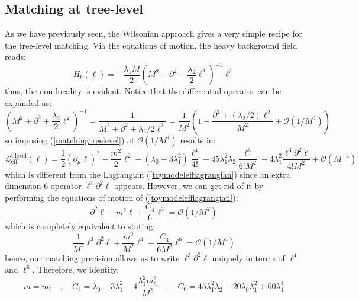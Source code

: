 \documentclass[11pt]{article}
\begin{document}
\subsection{Matching at tree-level}
As we have previously seen, the Wilsonian approach gives a very simple recipe for the tree-level matching. Via the equations of motion, the heavy background field reads:
\begin{equation}
    H_b(\ell)=-\dfrac{\lambda_1M}{2}\left(M^2+\partial^2+\dfrac{\lambda_2}{2}\ell^2 \right)^{-1}\ell^2
\end{equation}
thus, the non-locality is evident. Notice that the differential operator can be expanded as:
\begin{equation}
   \left(M^2+\partial^2+\dfrac{\lambda_2}{2}\ell^2 \right)^{-1}= \dfrac{1}{M^2+\partial^2+\lambda_2/2\ell^2}=\dfrac{1}{M^2}\left(1- \dfrac{\partial^2+(\lambda_2/2) \ell^2}{M^2} +\mathcal{O}(1/M^4)\right)
\end{equation}
so imposing (\ref{matchingtreelevel}) at $\mathcal{O}(1/M^4)$ results in:
\begin{equation}
    \mathcal{L}_{\text{eff}}^{\text{t.level}}(\ell)=\frac{1}{2}(\partial_\mu \ell)^2 - \frac{m^2}{2}\ell^2 - (\lambda_0 - 3\lambda_1^2) \frac{\ell^4}{4!} - 45\lambda_1^2\lambda_2 \frac{\ell^6}{6!M^2} - 4\lambda_1^2 \frac{\ell^3 \partial^2 \ell}{4! M^2} + \mathcal{O}(M^{-4})
\end{equation}
which is different from the Lagrangian (\ref{toymodelefflagrangian}) since an extra dimension 6 operator $\ell^3\partial^2 \ell$ appears. However, we can get rid of it by performing the equations of motion of (\ref{toymodelefflagrangian}):
\begin{equation}
    \partial^2\ell +m^2\ell+\dfrac{C_4}{6}\ell^3=\mathcal{O}(1/M^2)
\end{equation}
which is completely equivalent to stating:
\begin{equation}
     \dfrac{1}{M^2}\ell^3\partial^2\ell +\dfrac{m^2}{M^2}\ell^4+\dfrac{C_4}{6M^2}\ell^6=\mathcal{O}(1/M^4)
\end{equation}
hence, our matching precision allows us to write $\ell^3\partial^2 \ell$ uniquely in terms of $\ell^4$ and $\ell^6$. Therefore, we identify:
\begin{equation}
    m=m_\ell\quad,\quad C_4=\lambda_0-3\lambda_1^2-4\dfrac{\lambda_1^2m_\ell^2}{M^2}\quad,\quad C_6=45\lambda_1^2\lambda_2-20\lambda_0\lambda_1^2+60\lambda_1^4
\end{equation}
\end{document}
